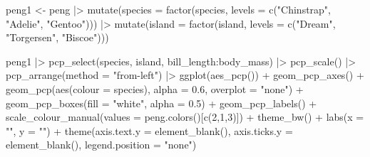 \documentclass[
  letterpaper,
  10pt,
  krantz2]{krantz}
\makeatletter
\newenvironment{Shaded}{\begin{snugshade}}{\end{snugshade}}
\newcommand{\AttributeTok}[1]{\textcolor[rgb]{0.40,0.45,0.13}{#1}}
\newcommand{\DecValTok}[1]{\textcolor[rgb]{0.68,0.00,0.00}{#1}}
\newcommand{\FloatTok}[1]{\textcolor[rgb]{0.68,0.00,0.00}{#1}}
\newcommand{\FunctionTok}[1]{\textcolor[rgb]{0.28,0.35,0.67}{#1}}
\newcommand{\NormalTok}[1]{\textcolor[rgb]{0.00,0.23,0.31}{#1}}
\newcommand{\OtherTok}[1]{\textcolor[rgb]{0.00,0.23,0.31}{#1}}
\newcommand{\SpecialCharTok}[1]{\textcolor[rgb]{0.37,0.37,0.37}{#1}}
\newcommand{\StringTok}[1]{\textcolor[rgb]{0.13,0.47,0.30}{#1}}
\newenvironment{kframe}{%
  \medskip{}
  \setlength{\fboxsep}{.8em}
  \def\at@end@of@kframe{}%
  \ifinner\ifhmode%
  \def\at@end@of@kframe{\end{minipage}}%
  \begin{minipage}{\columnwidth}%
  \fi\fi%
  \def\FrameCommand##1{\hskip\@totalleftmargin \hskip-\fboxsep
  \colorbox{shadecolor}{##1}\hskip-\fboxsep
      \hskip-\linewidth \hskip-\@totalleftmargin \hskip\columnwidth}%
  \MakeFramed {\advance\hsize-\width
    \@totalleftmargin\z@ \linewidth\hsize
    \@setminipage}}%
{\par\unskip\endMakeFramed%
  \at@end@of@kframe}
\renewenvironment{Shaded}{\begin{kframe}}{\end{kframe}}
\makeatother
\begin{document}
\begin{Shaded}
\begin{Highlighting}[]
\NormalTok{peng1 }\OtherTok{\textless{}{-}}\NormalTok{ peng }\SpecialCharTok{|\textgreater{}}
  \FunctionTok{mutate}\NormalTok{(}\AttributeTok{species =} \FunctionTok{factor}\NormalTok{(species, }\AttributeTok{levels =} \FunctionTok{c}\NormalTok{(}\StringTok{"Chinstrap"}\NormalTok{, }\StringTok{"Adelie"}\NormalTok{, }\StringTok{"Gentoo"}\NormalTok{))) }\SpecialCharTok{|\textgreater{}}
  \FunctionTok{mutate}\NormalTok{(}\AttributeTok{island =} \FunctionTok{factor}\NormalTok{(island, }\AttributeTok{levels =} \FunctionTok{c}\NormalTok{(}\StringTok{"Dream"}\NormalTok{, }\StringTok{"Torgersen"}\NormalTok{, }\StringTok{"Biscoe"}\NormalTok{)))}

\NormalTok{peng1 }\SpecialCharTok{|\textgreater{}}
  \FunctionTok{pcp\_select}\NormalTok{(species, island, bill\_length}\SpecialCharTok{:}\NormalTok{body\_mass) }\SpecialCharTok{|\textgreater{}}
  \FunctionTok{pcp\_scale}\NormalTok{() }\SpecialCharTok{|\textgreater{}}
  \FunctionTok{pcp\_arrange}\NormalTok{(}\AttributeTok{method =} \StringTok{"from{-}left"}\NormalTok{) }\SpecialCharTok{|\textgreater{}}
  \FunctionTok{ggplot}\NormalTok{(}\FunctionTok{aes\_pcp}\NormalTok{()) }\SpecialCharTok{+}
  \FunctionTok{geom\_pcp\_axes}\NormalTok{() }\SpecialCharTok{+}
  \FunctionTok{geom\_pcp}\NormalTok{(}\FunctionTok{aes}\NormalTok{(}\AttributeTok{colour =}\NormalTok{ species), }\AttributeTok{alpha =} \FloatTok{0.6}\NormalTok{, }\AttributeTok{overplot =} \StringTok{"none"}\NormalTok{) }\SpecialCharTok{+}
  \FunctionTok{geom\_pcp\_boxes}\NormalTok{(}\AttributeTok{fill =} \StringTok{"white"}\NormalTok{, }\AttributeTok{alpha =} \FloatTok{0.5}\NormalTok{) }\SpecialCharTok{+}
  \FunctionTok{geom\_pcp\_labels}\NormalTok{() }\SpecialCharTok{+}
  \FunctionTok{scale\_colour\_manual}\NormalTok{(}\AttributeTok{values =} \FunctionTok{peng.colors}\NormalTok{()[}\FunctionTok{c}\NormalTok{(}\DecValTok{2}\NormalTok{,}\DecValTok{1}\NormalTok{,}\DecValTok{3}\NormalTok{)]) }\SpecialCharTok{+}
  \FunctionTok{theme\_bw}\NormalTok{() }\SpecialCharTok{+}
  \FunctionTok{labs}\NormalTok{(}\AttributeTok{x =} \StringTok{""}\NormalTok{, }\AttributeTok{y =} \StringTok{""}\NormalTok{) }\SpecialCharTok{+}
  \FunctionTok{theme}\NormalTok{(}\AttributeTok{axis.text.y =} \FunctionTok{element\_blank}\NormalTok{(), }\AttributeTok{axis.ticks.y =} \FunctionTok{element\_blank}\NormalTok{(),}
        \AttributeTok{legend.position =} \StringTok{"none"}\NormalTok{) }
\end{Highlighting}
\end{Shaded}
\end{document}
